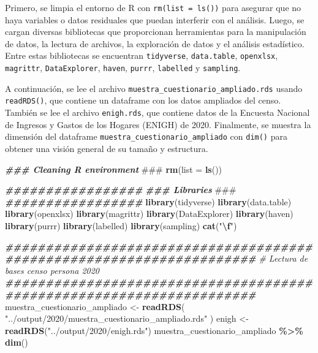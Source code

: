 \documentclass[
  12pt,
]{book}
\newenvironment{Shaded}{\begin{snugshade}}{\end{snugshade}}
\newcommand{\AlertTok}[1]{\textcolor[rgb]{0.94,0.16,0.16}{#1}}
\newcommand{\AttributeTok}[1]{\textcolor[rgb]{0.13,0.29,0.53}{#1}}
\newcommand{\CommentTok}[1]{\textcolor[rgb]{0.56,0.35,0.01}{\textit{#1}}}
\newcommand{\DocumentationTok}[1]{\textcolor[rgb]{0.56,0.35,0.01}{\textbf{\textit{#1}}}}
\newcommand{\FunctionTok}[1]{\textcolor[rgb]{0.13,0.29,0.53}{\textbf{#1}}}
\newcommand{\NormalTok}[1]{#1}
\newcommand{\OtherTok}[1]{\textcolor[rgb]{0.56,0.35,0.01}{#1}}
\newcommand{\SpecialCharTok}[1]{\textcolor[rgb]{0.81,0.36,0.00}{\textbf{#1}}}
\newcommand{\StringTok}[1]{\textcolor[rgb]{0.31,0.60,0.02}{#1}}
\begin{document}
Primero, se limpia el entorno de R con \texttt{rm(list\ =\ ls())} para asegurar que no haya variables o datos residuales que puedan interferir con el análisis. Luego, se cargan diversas bibliotecas que proporcionan herramientas para la manipulación de datos, la lectura de archivos, la exploración de datos y el análisis estadístico. Entre estas bibliotecas se encuentran \texttt{tidyverse}, \texttt{data.table}, \texttt{openxlsx}, \texttt{magrittr}, \texttt{DataExplorer}, \texttt{haven}, \texttt{purrr}, \texttt{labelled} y \texttt{sampling}.

A continuación, se lee el archivo \texttt{muestra\_cuestionario\_ampliado.rds} usando \texttt{readRDS()}, que contiene un dataframe con los datos ampliados del censo. También se lee el archivo \texttt{enigh.rds}, que contiene datos de la Encuesta Nacional de Ingresos y Gastos de los Hogares (ENIGH) de 2020. Finalmente, se muestra la dimensión del dataframe \texttt{muestra\_cuestionario\_ampliado} con \texttt{dim()} para obtener una visión general de su tamaño y estructura.

\begin{Shaded}
\begin{Highlighting}[]
\DocumentationTok{\#\#\# Cleaning R environment }\AlertTok{\#\#\#}
\FunctionTok{rm}\NormalTok{(}\AttributeTok{list =} \FunctionTok{ls}\NormalTok{())}

\DocumentationTok{\#\#\#\#\#\#\#\#\#\#\#\#\#\#\#\#\#}
\DocumentationTok{\#\#\# Libraries }\AlertTok{\#\#\#}
\DocumentationTok{\#\#\#\#\#\#\#\#\#\#\#\#\#\#\#\#\#}
\FunctionTok{library}\NormalTok{(tidyverse)}
\FunctionTok{library}\NormalTok{(data.table)}
\FunctionTok{library}\NormalTok{(openxlsx)}
\FunctionTok{library}\NormalTok{(magrittr)}
\FunctionTok{library}\NormalTok{(DataExplorer)}
\FunctionTok{library}\NormalTok{(haven)}
\FunctionTok{library}\NormalTok{(purrr)}
\FunctionTok{library}\NormalTok{(labelled)}
\FunctionTok{library}\NormalTok{(sampling)}
\FunctionTok{cat}\NormalTok{(}\StringTok{"}\SpecialCharTok{\textbackslash{}f}\StringTok{"}\NormalTok{)}

\DocumentationTok{\#\#\#\#\#\#\#\#\#\#\#\#\#\#\#\#\#\#\#\#\#\#\#\#\#\#\#\#\#\#\#\#\#\#\#\#\#\#\#\#\#\#\#\#\#\#\#\#\#\#\#\#\#\#\#\#\#\#\#\#\#\#\#\#\#\#\#\#\#}
\CommentTok{\# Lectura de bases censo persona 2020}
\DocumentationTok{\#\#\#\#\#\#\#\#\#\#\#\#\#\#\#\#\#\#\#\#\#\#\#\#\#\#\#\#\#\#\#\#\#\#\#\#\#\#\#\#\#\#\#\#\#\#\#\#\#\#\#\#\#\#\#\#\#\#\#\#\#\#\#\#\#\#\#\#\#}
\NormalTok{muestra\_cuestionario\_ampliado }\OtherTok{\textless{}{-}}
  \FunctionTok{readRDS}\NormalTok{(}
    \StringTok{"../output/2020/muestra\_cuestionario\_ampliado.rds"}
\NormalTok{  )}
\NormalTok{enigh }\OtherTok{\textless{}{-}} \FunctionTok{readRDS}\NormalTok{(}\StringTok{"../output/2020/enigh.rds"}\NormalTok{)}
\NormalTok{muestra\_cuestionario\_ampliado }\SpecialCharTok{\%\textgreater{}\%} \FunctionTok{dim}\NormalTok{()}
\end{Highlighting}
\end{Shaded}
\end{document}
